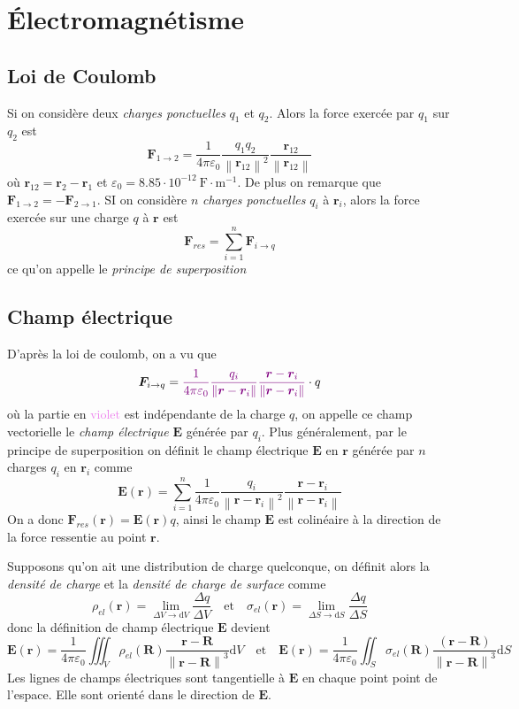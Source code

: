 \documentclass[10pt]{article}
\numberwithin{equation}{section}
\newcommand{\norme}[1]{ \left\| #1 \right\|}
\newcommand{\et}{\quad \text{et} \quad}
\begin{document}
\clearpage
\section{Électromagnétisme}
\subsection{Loi de Coulomb}
Si on considère deux \emph{charges ponctuelles} $q_1$ et $q_2$. Alors la force exercée par $q_1$ sur $q_2$ est
\[
\boxed{\bm F_{1 \to 2} = \frac{1}{4 \pi \varepsilon_0} \frac{q_1 q_2}{\norme{\bm r_{12}}^2} \frac{\bm r_{12}}{\norme{\bm r_{12}}}}
\]
où $\bm r_{12} = \bm r_2 - \bm r_1$ et $\varepsilon_0 = 8.85 \cdot 10^{-12} ~\mathrm F \cdot \mathrm m^{-1}$. De plus on remarque que $\bm F_{1 \to 2} = - \bm F_{2 \to 1}$. SI on considère $n$ \emph{charges ponctuelles} $q_i$ à $\bm r_i$, alors la force exercée sur une charge $q$ à $\bm r$ est 
\[
\boxed{\bm F_{res} = \sum_{i=1}^n \bm F_{i \to q}}
\]
ce qu'on appelle le \emph{principe de superposition}

\subsection{Champ électrique}
D'après la loi de coulomb, on a vu que
	\[
	\bm F_{i \to q} = {\color{violet} \frac{1}{4 \pi \varepsilon_0} \frac{q_i}{\norme{\bm r - \bm r_i}} \frac{\bm r - \bm r_i}{\norme{\bm r - \bm r_i}}} \cdot q
	\]
	où la partie en \textcolor{violet}{violet} est indépendante de la charge $q$, on appelle ce champ vectorielle le \emph{champ électrique} $\bm E$ générée par $q_i$. Plus généralement, par le principe de superposition on définit le champ électrique $\bm E$ en $\bm r$ générée par $n$ charges $q_i$ en $\bm r_i$ comme
	\[
	\boxed{\bm E (\bm r) = \sum_{i=1}^n \frac{1}{4 \pi \varepsilon_0}  \frac{q_i}{\norme{\bm r- \bm r_i}^2} \frac{\bm r - \bm r_i}{\norme{\bm r - \bm r_i}}}
	\]
	On a donc $\bm F_{res}(\bm r) = \bm E(\bm r) q$, ainsi le champ $\bm E$ est colinéaire à la direction de la force ressentie au point $\bm r$.
	
	Supposons qu'on ait une distribution de charge quelconque, on définit alors la \emph{densité de charge} et la \emph{densité de charge de surface} comme
	\[
	\boxed{\rho_{el} (\bm r) = \lim_{\Delta V \to \mathrm d V} \frac{\Delta q}{\Delta V}} \et  \boxed{\sigma_{el} (\bm r) = \lim_{\Delta S \to \mathrm d S} \frac{\Delta q}{\Delta S}}
	\]
	donc la définition de champ électrique $\bm E$ devient
	\[
	\boxed{\bm E (\bm r) = \frac{1}{4 \pi \varepsilon_0} \iiint_V \rho_{el}(\bm R) \frac{\bm r - \bm R}{\norme{\bm r  - \bm R}^3} \mathrm dV} \et \boxed{\bm E(\bm r) = \frac{1}{4 \pi \varepsilon_0} \iint_S \sigma_{el} (\bm R) \frac{ (\bm r- \bm R)}{\norme{\bm r- \bm R}^3} \mathrm d S }
	\]
	Les lignes de champs électriques sont tangentielle à $\bm E$ en chaque point point de l'espace. Elle sont orienté dans le direction de $\bm E$.
	
\end{document}
